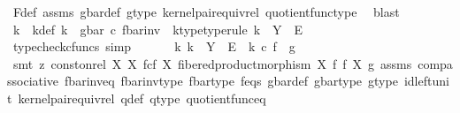 \begin{isabellebody}
\ F{\isacharunderscore}{\kern0pt}def\ assms{\isacharparenleft}{\kern0pt}{}{\isacharparenright}{\kern0pt}\ g{\isacharunderscore}{\kern0pt}bar{\isacharunderscore}{\kern0pt}def\ g{\isacharunderscore}{\kern0pt}type\ kernel{\isacharunderscore}{\kern0pt}pair{\isacharunderscore}{\kern0pt}equiv{\isacharunderscore}{\kern0pt}rel\ quotient{\isacharunderscore}{\kern0pt}func{\isacharunderscore}{\kern0pt}type\ \isamarkupfalse%
\ blast\isanewline
\ \ \isamarkupfalse%
\ k\ \ k{\isacharunderscore}{\kern0pt}def{\isacharcolon}{\kern0pt}\ {\isachardoublequoteopen}k\ {\isacharequal}{\kern0pt}\ g{\isacharunderscore}{\kern0pt}bar\ {\isasymcirc}\isactrlsub c\ f{\isacharunderscore}{\kern0pt}bar{\isacharunderscore}{\kern0pt}inv{\isachardoublequoteclose}\ \ k{\isacharunderscore}{\kern0pt}type{\isacharbrackleft}{\kern0pt}type{\isacharunderscore}{\kern0pt}rule{\isacharbrackright}{\kern0pt}{\isacharcolon}{\kern0pt}\ {\isachardoublequoteopen}k\ {\isacharcolon}{\kern0pt}\ Y\ {\isasymrightarrow}\ E{\isachardoublequoteclose}\isanewline
\ \ \ \ \isamarkupfalse%
\ {\isacharparenleft}{\kern0pt}typecheck{\isacharunderscore}{\kern0pt}cfuncs{\isacharcomma}{\kern0pt}\ simp{\isacharparenright}{\kern0pt}\ \isanewline
\ \ \isamarkupfalse%
\ \isamarkupfalse%
\ {\isachardoublequoteopen}{\isasymexists}k{\isachardot}{\kern0pt}\ k\ {\isacharcolon}{\kern0pt}\ Y\ {\isasymrightarrow}\ E\ {\isasymand}\ k\ {\isasymcirc}\isactrlsub c\ f\ {\isacharequal}{\kern0pt}\ g{\isachardoublequoteclose}\isanewline
\ \ \ \ \isamarkupfalse%
\ {\isacharparenleft}{\kern0pt}smt\ {\isacharparenleft}{\kern0pt}z{}{\isacharparenright}{\kern0pt}\ {\isacartoucheopen}const{\isacharunderscore}{\kern0pt}on{\isacharunderscore}{\kern0pt}rel\ X\ {\isacharparenleft}{\kern0pt}X\ \isactrlbsub f\isactrlesub {\isasymtimes}\isactrlsub c\isactrlbsub f\isactrlesub \ X{\isacharcomma}{\kern0pt}\ fibered{\isacharunderscore}{\kern0pt}product{\isacharunderscore}{\kern0pt}morphism\ X\ f\ f\ X{\isacharparenright}{\kern0pt}\ g{\isacartoucheclose}\ assms{\isacharparenleft}{\kern0pt}{}{\isacharparenright}{\kern0pt}\ comp{\isacharunderscore}{\kern0pt}associative{}\ f{\isacharunderscore}{\kern0pt}bar{\isacharunderscore}{\kern0pt}inv{\isacharunderscore}{\kern0pt}eq{}\ f{\isacharunderscore}{\kern0pt}bar{\isacharunderscore}{\kern0pt}inv{\isacharunderscore}{\kern0pt}type\ f{\isacharunderscore}{\kern0pt}bar{\isacharunderscore}{\kern0pt}type\ f{\isacharunderscore}{\kern0pt}eqs\ g{\isacharunderscore}{\kern0pt}bar{\isacharunderscore}{\kern0pt}def\ g{\isacharunderscore}{\kern0pt}bar{\isacharunderscore}{\kern0pt}type\ g{\isacharunderscore}{\kern0pt}type\ id{\isacharunderscore}{\kern0pt}left{\isacharunderscore}{\kern0pt}unit{}\ kernel{\isacharunderscore}{\kern0pt}pair{\isacharunderscore}{\kern0pt}equiv{\isacharunderscore}{\kern0pt}rel\ q{\isacharunderscore}{\kern0pt}def\ q{\isacharunderscore}{\kern0pt}type\ quotient{\isacharunderscore}{\kern0pt}func{\isacharunderscore}{\kern0pt}eq{\isacharparenright}{\kern0pt}\isanewline

\end{isabellebody}

